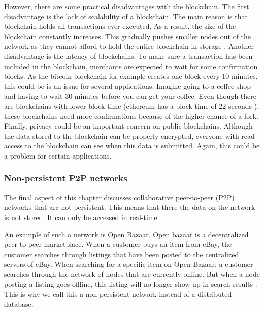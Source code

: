 However, there are some practical disadvantages with the blockchain. The first disadvantage is the lack of scalability of a blockchain. The main reason is that blockchain holds all transactions ever executed. As a result, the size of the blockchain constantly increases. This gradually pushes smaller nodes out of the network as they cannot afford to hold the entire blockchain in storage \cite{blockchain-scalability}. Another disadvantage is the latency of blockchains. To make sure a transaction has been included in the blockchain, merchants are expected to wait for some confirmation blocks. As the bitcoin blockchain for example creates one block every 10 minutes, this could be is an issue for several applications. Imagine going to a coffee shop and having to wait 30 minutes before you can get your coffee. Even though there are blockchains with lower block time (ethereum has a block time of 22 seconds \cite{ethereum-block-time}), these blockchains need more confirmations because of the higher chance of a fork. Finally, privacy could be an important concern on public blockchains. Although the data stored to the blockchain can be properly encrypted, everyone with read access to the blockchain can see when this data is submitted. Again, this could be a problem for certain applications.

\subsubsection{Non-persistent P2P networks}

The final aspect of this chapter discusses collaborative peer-to-peer (P2P) networks that are not persistent. This means that there the data on the network is not stored. It can only be accessed in real-time. 

An example of such a network is Open Bazaar. Open bazaar is a decentralized peer-to-peer marketplace. When a customer buys an item from eBay, the customer searches through listings that have been posted to the centralized servers of eBay. When searching for a specific item on Open Bazaar, a customer searches through the network of nodes that are currently online. But when a node posting a listing goes offline, this listing will no longer show up in search results \cite{openbazaar-faq}. This is why we call this a non-persistent network instead of a distributed database.

